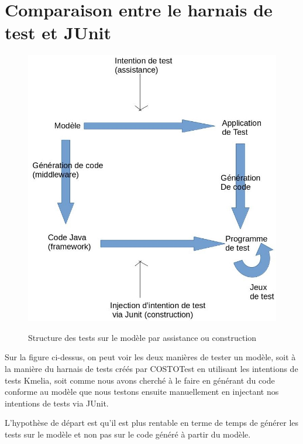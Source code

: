 \chapter{Comparaison entre le harnais de test et JUnit}
\label{chap:comparaison}

    \begin{figure}[H]
        \begin{center}
          \includegraphics[scale=0.5]{images/structSchema.jpg}
          \label{fig:StructModelTests}
          \caption{Structure des tests sur le modèle par assistance ou construction}
        \end{center}
    \end{figure} 

Sur la figure ci-dessus, on peut voir les deux manières de tester un modèle, soit à la manière du harnais de tests créés par COSTOTest en utilisant les intentions de tests Kmelia, soit comme nous avons cherché à le faire en générant du code conforme au modèle que nous testons ensuite manuellement en injectant nos intentions de tests via JUnit.

L'hypothèse de départ est qu'il est plus rentable en terme de temps de générer les tests sur le modèle et non pas sur le code généré à partir du modèle.

